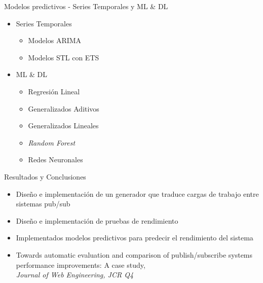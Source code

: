 \documentclass[12pt, spanish]{beamer}
\begin{document}
\begin{frame}{Modelos predictivos - Series Temporales y ML \& DL} %
    \begin{itemize}
        \item Series Temporales
        \begin{itemize}
            \item Modelos ARIMA
            \item Modelos STL con ETS\vspace{0.25cm}
        \end{itemize}
        
        \item ML \& DL
        \begin{itemize}
            \item Regresión Lineal
            \item Generalizados Aditivos
            \item Generalizados Lineales
            \item \textit{Random Forest}
            \item Redes Neuronales
        \end{itemize}
    \end{itemize}
\end{frame}


\begin{frame}{Resultados y Conclusiones}
    \begin{itemize}
        \item Diseño e implementación de un generador que traduce cargas de trabajo entre sistemas pub/sub\vspace{0.25cm}
        \item Diseño e implementación de pruebas de rendimiento\vspace{0.25cm}
        \item Implementados modelos predictivos para predecir el rendimiento del sistema\vspace{0.75cm}

        \item Towards automatic evaluation and comparison of publish/subscribe systems performance improvements: A case study, \\ \textit{Journal of Web Engineering, JCR Q4}
    \end{itemize}
\end{frame}
\end{document}
